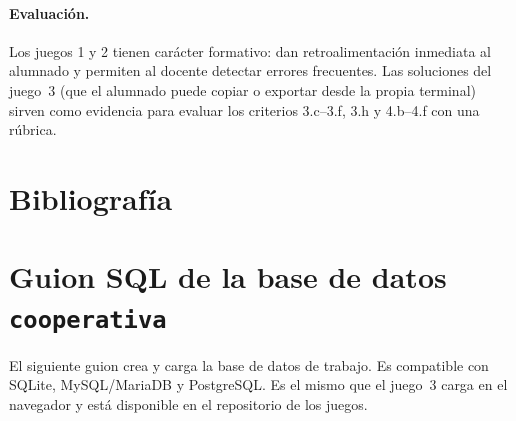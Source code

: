 \documentclass[11pt,a4paper]{article}
\begin{document}
\paragraph{Evaluación.} Los juegos 1 y 2 tienen carácter formativo: dan
retroalimentación inmediata al alumnado y permiten al docente detectar errores
frecuentes. Las soluciones del juego~3 (que el alumnado puede copiar o exportar
desde la propia terminal) sirven como evidencia para evaluar los criterios 3.c–3.f, 3.h y
4.b–4.f con una rúbrica.

\section{Bibliografía}

\nocite{*}
\printbibliography[heading=none]

\appendix
\section{Guion SQL de la base de datos \texttt{cooperativa}}
\label{ap:script}

El siguiente guion crea y carga la base de datos de trabajo. Es compatible con SQLite,
MySQL/MariaDB y PostgreSQL. Es el mismo que el juego~3 carga en el navegador y está
disponible en el repositorio de los juegos.


\end{document}
